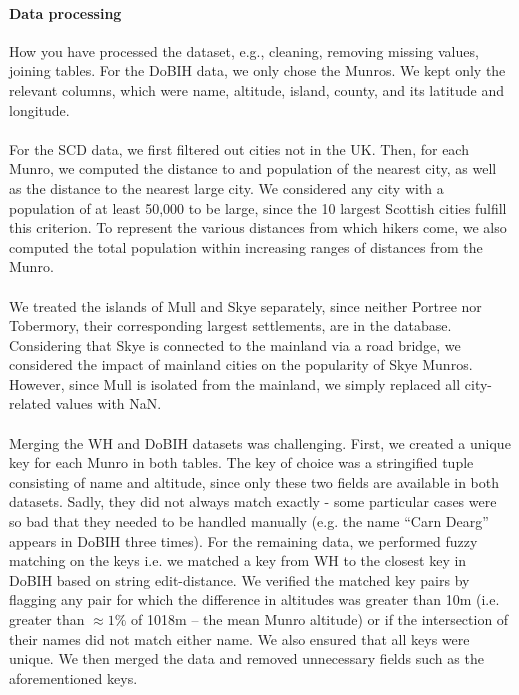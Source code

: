 \documentclass[11pt,a4paper]{article}
\begin{document}
\paragraph{Data processing} How you have processed the dataset, e.g.,
cleaning, removing missing values, joining tables.
For the DoBIH data, we only chose the Munros. We kept only the relevant columns, which were name, altitude, island, county, and its latitude and longitude. \\ \\
For the SCD data, we first filtered out cities not in the UK. Then, for each Munro, we computed the distance to and population of the nearest city, as well as the distance to the nearest large city. We considered any city with a population of at least 50,000 to be large, since the 10 largest Scottish cities fulfill this criterion. To represent the various distances from which hikers come, we also computed the total population within increasing ranges of distances from the Munro.\\ \\
We treated the islands of Mull and Skye separately, since neither Portree nor Tobermory, their corresponding largest settlements, are in the database. Considering that Skye is connected to the mainland via a road bridge, we considered the impact of mainland cities on the popularity of Skye Munros. However, since Mull is isolated from the mainland, we simply replaced all city-related values with NaN. \\ \\
Merging the WH and DoBIH datasets was challenging. First, we created a unique key for each Munro in both tables. The key of choice was a stringified tuple consisting of name and altitude, since only these two fields are available in both datasets. Sadly, they did not always match exactly - some particular cases were so bad that they needed to be handled manually (e.g. the name “Carn Dearg” appears in DoBIH three times). For the remaining data, we performed fuzzy matching on the keys i.e. we matched a key from WH to the closest key in DoBIH based on string edit-distance. We verified the matched key pairs by flagging any pair for which the difference in altitudes was greater than 10m (i.e. greater than $\approx1\%$ of 1018m – the mean Munro altitude) or if the intersection of their names did not match either name. We also ensured that all keys were unique. We then merged the data and removed unnecessary fields such as the aforementioned keys. \\ \\
\end{document}
